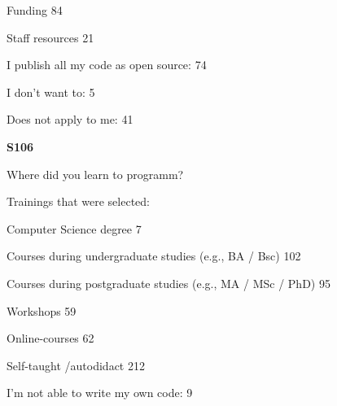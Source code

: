  Funding 84

 Staff resources 21

I publish all my code as open source: 74

I don't want to: 5

Does not apply to me: 41

\textbf{S106}

Where did you learn to programm?


Trainings that were selected: 

 Computer Science degree 7

 Courses during undergraduate studies (e.g., BA / Bsc) 102

 Courses during postgraduate studies (e.g., MA / MSc / PhD) 95

 Workshops 59

 Online-courses 62

 Self-taught /autodidact 212

I'm not able to write my own code: 9


